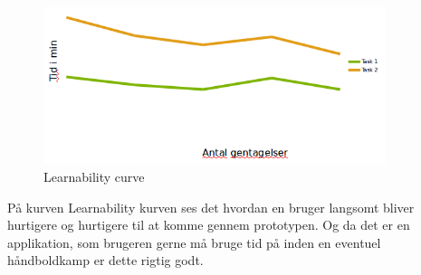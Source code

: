 \newpage
\begin{figure}[ht!]
\centering
\includegraphics[width=100mm]{images/learnability}
\caption{Learnability curve}
\end{figure}
På kurven Learnability kurven ses det hvordan en bruger langsomt bliver hurtigere og hurtigere til at komme gennem prototypen. Og da det er en applikation, som brugeren gerne må bruge tid på inden en eventuel håndboldkamp er dette rigtig godt. 



